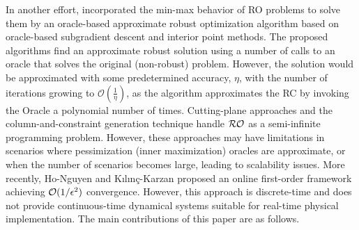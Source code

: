 \documentclass[journal,twoside,web]{ieeecolor}
\newcommand{\rev}[1]{#1}
\begin{document}
In another effort, \cite{bental2015} incorporated the min-max behavior of RO problems to solve them by an oracle-based approximate robust optimization algorithm based on oracle-based subgradient descent and interior point methods. The proposed algorithms find an approximate robust solution using a number of calls to an oracle that solves the original (non-robust) problem. However, the solution would be approximated with some predetermined accuracy, $\eta$, with the number of iterations growing to $\mathcal{O}(\frac{1}{\eta})$, as the algorithm approximates the RC by invoking the Oracle a polynomial number of times. Cutting-plane approaches \cite{mutapcic2009} and the column-and-constraint generation technique \cite{zeng2013} handle ${\cal RO}$ as a semi-infinite programming problem. However, these approaches may have limitations in scenarios where pessimization (inner maximization) oracles are approximate, or when the number of scenarios becomes large, leading to scalability issues. \rev{More recently, Ho-Nguyen and K{\i}l{\i}n\c{c}-Karzan \cite{honguyen2018} proposed an online first-order framework achieving ${\cal O}(1/\epsilon^2)$ convergence. However, this approach is discrete-time and does not provide continuous-time dynamical systems suitable for real-time physical implementation.} The main contributions of this paper are as follows.

\end{document}

